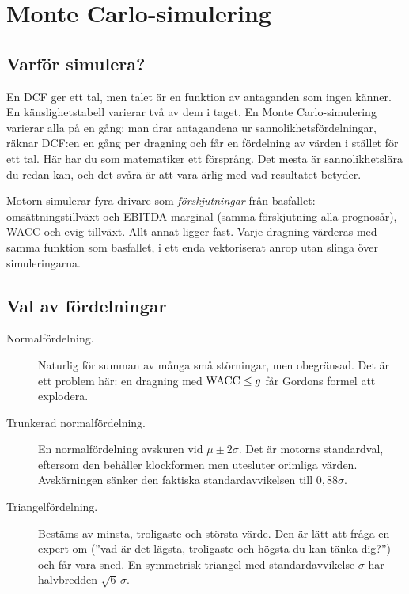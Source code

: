 \section{Monte Carlo-simulering}
\label{sec:mc}

\subsection{Varför simulera?}

En DCF ger ett tal, men talet är en funktion av antaganden som ingen känner. En
känslighetstabell varierar två av dem i taget. En Monte Carlo-simulering varierar alla på en
gång: man drar antagandena ur sannolikhetsfördelningar, räknar DCF:en en gång per dragning och
får en fördelning av värden i stället för ett tal. Här har du som matematiker ett försprång.
Det mesta är sannolikhetslära du redan kan, och det svåra är att vara ärlig med vad resultatet
betyder.

Motorn simulerar fyra drivare som \emph{förskjutningar} från basfallet: omsättningstillväxt och
EBITDA-marginal (samma förskjutning alla prognosår), WACC och evig tillväxt. Allt annat ligger
fast. Varje dragning värderas med samma funktion  som basfallet, i ett enda
vektoriserat anrop utan slinga över simuleringarna.

\subsection{Val av fördelningar}

\begin{description}
  \item[Normalfördelning.] Naturlig för summan av många små störningar, men obegränsad. Det är
    ett problem här: en dragning med $\mathrm{WACC} \le g$ får Gordons formel att explodera.
  \item[Trunkerad normalfördelning.] En normalfördelning avskuren vid $\mu \pm 2\sigma$. Det är
    motorns standardval, eftersom den behåller klockformen men utesluter orimliga värden.
    Avskärningen sänker den faktiska standardavvikelsen till $0,88\sigma$.
  \item[Triangelfördelning.] Bestäms av minsta, troligaste och största värde. Den är lätt att
    fråga en expert om (”vad är det lägsta, troligaste och högsta du kan tänka dig?”) och får
    vara sned. En symmetrisk triangel med standardavvikelse $\sigma$ har halvbredden
    $\sqrt6\,\sigma$.
\end{description}

